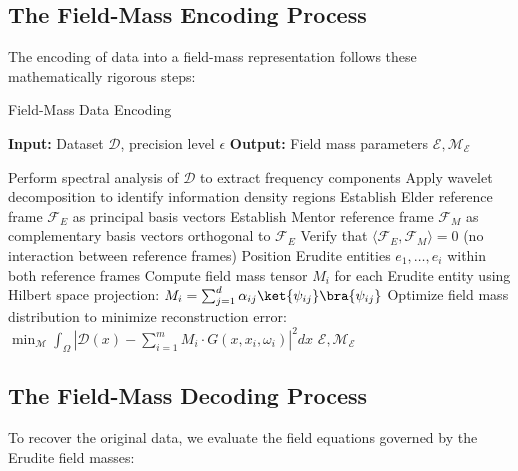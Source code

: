 \subsection{The Field-Mass Encoding Process}

The encoding of data into a field-mass representation follows these mathematically rigorous steps:

\begin{algorithm}[h]
\caption{Field-Mass Data Encoding}
\begin{algorithmic}[1]
\State \textbf{Input:} Dataset $\mathcal{D}$, precision level $\epsilon$
\State \textbf{Output:} Field mass parameters $\mathcal{E}, \mathcal{M}_{\mathcal{E}}$

\State Perform spectral analysis of $\mathcal{D}$ to extract frequency components
\State Apply wavelet decomposition to identify information density regions
\State Establish Elder reference frame $\mathcal{F}_E$ as principal basis vectors
\State Establish Mentor reference frame $\mathcal{F}_M$ as complementary basis vectors orthogonal to $\mathcal{F}_E$
\State Verify that $\langle \mathcal{F}_E, \mathcal{F}_M \rangle = 0$ (no interaction between reference frames)
\State Position Erudite entities $e_1, \ldots, e_i$ within both reference frames
\State Compute field mass tensor $M_i$ for each Erudite entity using Hilbert space projection:
\State \hspace{1em} $M_i = \sum_{j=1}^d \alpha_{ij} \ket{\psi_{ij}} \bra{\psi_{ij}}$
\State Optimize field mass distribution to minimize reconstruction error:
\State \hspace{1em} $\min_{\mathcal{M}} \int_\Omega \left| \mathcal{D}(x) - \sum_{i=1}^m M_i \cdot G(x, x_i, \omega_i) \right|^2 dx$
\State \Return $\mathcal{E}, \mathcal{M}_{\mathcal{E}}$
\end{algorithmic}
\end{algorithm}

\subsection{The Field-Mass Decoding Process}

To recover the original data, we evaluate the field equations governed by the Erudite field masses:

